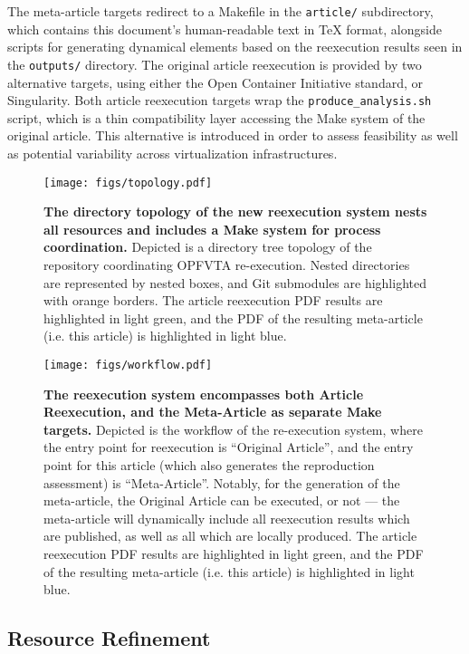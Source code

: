 The meta-article targets redirect to a Makefile in the \texttt{article/} subdirectory, which contains this document's human-readable text in \TeX{} format, alongside scripts for generating dynamical elements based on the reexecution results seen in the \texttt{outputs/} directory.
The original article reexecution is provided by two alternative targets, using either the Open Container Initiative standard, or Singularity.
Both article reexecution targets wrap the \texttt{produce\_analysis.sh} script, which is a thin compatibility layer accessing the Make system of the original article.
This alternative is introduced in order to assess feasibility as well as potential variability across virtualization infrastructures.


\begin{figure*}
	\centering
	\texttt{[image: figs/topology.pdf]}
	\caption{
		\textbf{The directory topology of the new reexecution system nests all resources and includes a Make system for process coordination.}
		Depicted is a directory tree topology of the repository coordinating OPFVTA re-execution.
		Nested directories are represented by nested boxes, and Git submodules are highlighted with orange borders.
		The article reexecution PDF results are highlighted in light green, and the PDF of the resulting meta-article (i.e. this article) is highlighted in light blue.
	}
	\label{fig:topology}
\end{figure*}


\begin{figure*}
	\centering
	\texttt{[image: figs/workflow.pdf]}
	\caption{
		\textbf{The reexecution system encompasses both Article Reexecution, and the Meta-Article as separate Make targets.}
		Depicted is the workflow of the re-execution system, where the entry point for reexecution is “Original Article”, and the entry point for this article (which also generates the reproduction assessment) is “Meta-Article”.
		Notably, for the generation of the meta-article, the Original Article can be executed, or not — the meta-article will dynamically include all reexecution results which are published, as well as all which are locally produced.
		The article reexecution PDF results are highlighted in light green, and the PDF of the resulting meta-article (i.e. this article) is highlighted in light blue.
	}
	\label{fig:workflow}
\end{figure*}


\subsection{Resource Refinement}


